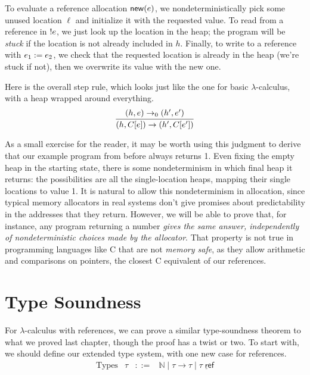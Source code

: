 \documentclass{amsbook}
\theoremstyle{definition}
\theoremstyle{remark}
\numberwithin{section}{chapter}
\numberwithin{equation}{chapter}
\begin{document}
To evaluate a reference allocation $\mathsf{new}(e)$, we nondeterministically pick some unused location $\ell$ and initialize it with the requested value.
To read from a reference in $!e$, we just look up the location in the heap; the program will be \emph{stuck} if the location is not already included in $h$.
Finally, to write to a reference with $e_1 := e_2$, we check that the requested location is already in the heap (we're stuck if not), then we overwrite its value with the new one.

Here is the overall step rule, which looks just like the one for basic $\lambda$-calculus, with a heap wrapped around everything.
$$\infer{\smallstep{(h, \plug{C}{e})}{(h', \plug{C}{e'})}}{
  \smallstepo{(h, e)}{(h', e')}
}$$

As a small exercise for the reader, it may be worth using this judgment to derive that our example program from before always returns 1.
Even fixing the empty heap in the starting state, there is some nondeterminism in which final heap it returns: the possibilities are all the single-location heaps, mapping their single locations to value 1.
It is natural to allow this nondeterminism in allocation, since typical memory allocators in real systems don't give promises about predictability in the addresses that they return.
However, we will be able to prove that, for instance, any program returning a number \emph{gives the same answer, independently of nondeterministic choices made by the allocator}.
That property is not true in programming languages like C that are not \emph{memory safe}, as they allow arithmetic and comparisons on pointers, the closest C equivalent of our references.


\section{Type Soundness}

\newcommand{\reft}[1]{#1 \; \mathsf{ref}}

For $\lambda$-calculus with references, we can prove a similar type-soundness theorem to what we proved last chapter, though the proof has a twist or two.
To start with, we should define our extended type system, with one new case for references.
$$\begin{array}{rrcl}
  \textrm{Types} & \tau &::=& \mathbb N \mid \tau \to \tau \mid \underline{\reft{\tau}}
\end{array}$$
\end{document}
